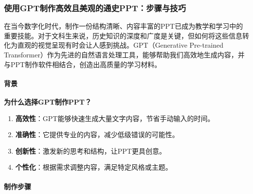 \hypertarget{ux4f7fux7528gptux5236ux4f5cux9ad8ux6548ux4e14ux7f8eux89c2ux7684ux901aux53f2pptux6b65ux9aa4ux4e0eux6280ux5de7}{%
\subsubsection{使用GPT制作高效且美观的通史PPT：步骤与技巧}\label{ux4f7fux7528gptux5236ux4f5cux9ad8ux6548ux4e14ux7f8eux89c2ux7684ux901aux53f2pptux6b65ux9aa4ux4e0eux6280ux5de7}}

在当今数字化时代，制作一份结构清晰、内容丰富的PPT已成为教学和学习中的重要技能。对于文科生来说，历史知识的深度和广度是关键，但如何将这些信息转化为直观的视觉呈现有时会让人感到挑战。GPT（Generative
Pre-trained
Transformer）作为先进的自然语言处理工具，能够帮助我们高效地生成内容，并与PPT制作软件相结合，创造出高质量的学习材料。

\hypertarget{ux80ccux666f}{%
\paragraph{背景}\label{ux80ccux666f}}

\textbf{为什么选择GPT制作PPT？}

\begin{enumerate}
\def\labelenumi{\arabic{enumi}.}

\item
  \textbf{高效性}：GPT能够快速生成大量文字内容，节省手动输入的时间。
\item
  \textbf{准确性}：它提供专业的内容，减少低级错误的可能性。
\item
  \textbf{创新性}：激发新的思考和结构，让PPT更具创意。
\item
  \textbf{个性化}：根据需求调整内容，满足特定风格或主题。
\end{enumerate}

\hypertarget{ux5236ux4f5cux6b65ux9aa4}{%
\paragraph{制作步骤}\label{ux5236ux4f5cux6b65ux9aa4}}

